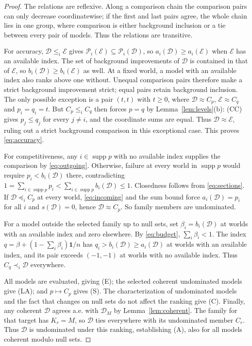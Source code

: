 \documentclass[11pt]{article}
\theoremstyle{remark}
\newcommand{\one}{\mathbf 1}
\newcommand{\supp}{\operatorname{supp}}
\newcommand{\Dscr}{\mathcal D}
\newcommand{\Escr}{\mathcal E}
\begin{document}
\begin{proof}
The relations are reflexive. Along a comparison chain the comparison pairs
can only decrease coordinatewise; if the first and last pairs agree, the
whole chain lies in one group, where comparison is either background
inclusion or a tie between every pair of models. Thus the relations are transitive.

For accuracy, $\Dscr\le_i\Escr$ gives $\mathcal P_i(\Escr)\subseteq\mathcal P_i(\Dscr)$,
so $a_i(\Dscr)\ge a_i(\Escr)$ when $\Escr$ has an available index. The set of background improvements
of $\Dscr$ is contained in that of $\Escr$, so $b_i(\Dscr)\ge b_i(\Escr)$ as well.
At a fixed world, a model with an available index also ranks above one without. Unequal comparison pairs
therefore make a strict background improvement strict; equal pairs retain
background inclusion. The only possible exception is a pair $(t,t)$ with $t\ge0$, where $\Dscr\approx C_{p}$, $\Escr\approx C_{q}$ and $p_i=q_i=t$.
But $C_{p}\le_iC_{q}$ then forces $p=q$ by Lemma~\ref{lem:levels}(b): (CC) gives
$p_j\le q_j$ for every $j\ne i$, and the coordinate sums are equal.
Thus $\Dscr\approx \Escr$, ruling out a strict background comparison in this
exceptional case. This proves \eqref{eq:accuracy}.

For competitiveness, any $i\in\supp p$ with no available index supplies the comparison
by \eqref{eq:outgoing}. Otherwise, failure at every world in $\supp p$ would
require $p_i<b_i(\Dscr)$ there, contradicting
$1=\sum_{i\in\supp p}p_i<\sum_{i\in\supp p}b_i(\Dscr)\le1$.
Closedness follows from \eqref{eq:sections}.
If $\Dscr\preceq_iC_{p}$ at every world, \eqref{eq:incoming} and the sum bound force
$a_i(\Dscr)=p_i$ for all $i$ and $s(\Dscr)=0$, hence $\Dscr\approx C_{p}$.
So family members are undominated.

For a model outside the selected family up to null sets, set $\beta_i=b_i(\Dscr)$ at worlds with an available index and zero
elsewhere. By \eqref{eq:budget}, $\sum_i\beta_i<1$. The index
$q=\beta+(1-\sum_i\beta_i)\one/n$ has $q_i>b_i(\Dscr)\ge a_i(\Dscr)$ at worlds with an available index, and its pair exceeds $(-1,-1)$ at worlds with no available index. Thus $C_{q}\prec_i\Dscr$
everywhere.

All models are evaluated, giving (E); the selected coherent undominated models
give (LA); and $p\mapsto C_{p}$ gives (S). The characterization of undominated
models and the fact that changes on null sets do not affect the ranking give (C).
Finally, any coherent $\Dscr$ agrees a.e. with $\Dscr_{M}$ by Lemma~\ref{lem:coherent}.
The family for that target has $K_r=M$, so $\Dscr$ ties everywhere with its
undominated member $C_{r}$. Thus $\Dscr$ is undominated under this ranking,
establishing (A), also for all models coherent modulo null sets.
\end{proof}
\end{document}
